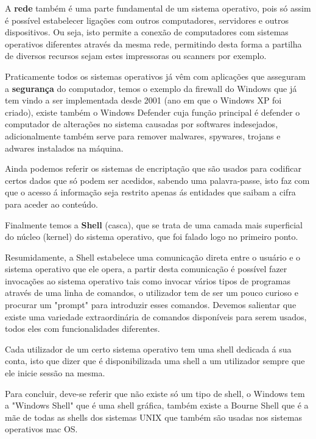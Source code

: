 \documentclass{report}
\begin{document}
A \textbf{rede} também é uma parte fundamental de um sistema operativo, pois só assim é possível estabelecer ligações com outros computadores, servidores e outros dispositivos. Ou seja, isto permite a conexão de computadores com sistemas operativos diferentes através da mesma rede, permitindo desta forma a partilha de diversos recursos sejam estes impressoras ou scanners por exemplo.

\vspace{5mm} %

Praticamente todos os sistemas operativos já vêm com aplicações que asseguram a \textbf{segurança} do computador, temos o exemplo da firewall do Windows que já tem vindo a ser implementada desde 2001 (ano em que o Windows XP foi criado), existe também o Windows Defender cuja função principal é defender o computador de alterações no sistema causadas por softwares indesejados, adicionalmente também serve para remover malwares, spywares, trojans e adwares instalados na máquina.

Ainda podemos referir os sistemas de encriptação que são usados para codificar certos dados que só podem ser acedidos, sabendo uma palavra-passe, isto faz com que o acesso á informação seja restrito apenas ás entidades que saibam a cifra para aceder ao conteúdo.

\vspace{5mm} %

Finalmente temos a \textbf{Shell} (casca), que se trata de uma camada mais superficial do núcleo (kernel) do sistema operativo, que foi falado logo no primeiro ponto.

Resumidamente, a Shell estabelece uma comunicação direta entre o usuário e o sistema operativo que ele opera, a partir desta comunicação é possível fazer invocações ao sistema operativo tais como invocar vários tipos de programas através de uma linha de comandos, o utilizador tem de ser um pouco curioso e procurar um "prompt" para introduzir esses comandos. Devemos salientar que existe uma variedade extraordinária de comandos disponíveis para serem usados, todos eles com funcionalidades diferentes.

Cada utilizador de um certo sistema operativo tem uma shell dedicada á sua conta, isto que dizer que é disponibilizada uma shell a um utilizador sempre que ele inicie sessão na mesma.

Para concluir, deve-se referir que não existe só um tipo de shell, o Windows tem a "Windows Shell" que é uma shell gráfica, também existe a Bourne Shell que é a mãe de todas as shells dos sistemas UNIX que também são usadas nos sistemas operativos mac OS.  
\end{document}
